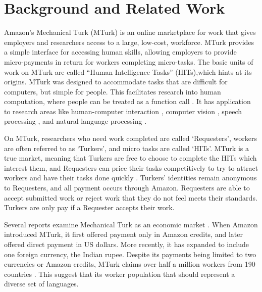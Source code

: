 \documentclass[11pt]{article}
\begin{document}

\section{Background and Related Work}
Amazon's Mechanical Turk (MTurk) is an online marketplace for work that gives employers and researchers access to a large, low-cost, workforce. MTurk provides a simple interface for accessing human skills, allowing employers to provide micro-payments in return for workers completing micro-tasks.  The basic units of work on MTurk are called ``Human Intelligence Tasks'' (HITs),which hints at its origins.  MTurk was designed to accommodate tasks that are difficult for computers, but simple for people. This facilitates research into human computation, where people can be treated as a function call \cite{vonAhn2008,Little2009,quinn-bederson:2011}.  It has application to research areas like human-computer interaction \cite{bigham-et-al:2010,bernstein-et-al:2010}, computer vision  \cite{sorkin-forsyth:2008,deng-et-al:2010,rashtchian:10}, speech processing \cite{marge:10,lane-EtAl:2010:MTURK,Parent-Eskenazi:2011,Eskenazi:2013:crowdsourcing-speech-book},  and natural language processing \cite{Snow2008,callisonburch-dredze:2010:MTURK,laws-scheible-schutze:2011:EMNLP}. 

\nocite{novotney-callisonburch:2010:NAACLHLT}

On MTurk, researchers who need work completed are called `Requesters', workers are often referred to as `Turkers', and micro tasks are called `HITs'.  MTurk is a true market, meaning that Turkers are free to choose to complete the HITs which interest them, and Requesters can price their tasks competitively to try to attract workers and have their tasks done quickly \cite{faridani-et-al:2011,singer-mittal:2011}. Turkers' identities remain anonymous to Requesters, and all payment occurs through Amazon. Requesters are able to accept submitted work or reject work that they do not feel meets their standards.  Turkers are only pay if a Requester accepts their work. 

Several reports examine Mechanical Turk as an economic market \cite{ipeirotis:2010:marketplace,lehdonvirta-ernkvist:2011}.  When Amazon introduced MTurk, it first offered payment only in Amazon credits, and later offered direct payment in US dollars. More recently, it has expanded to include one foreign currency, the Indian rupee. Despite its payments being limited to two currencies or Amazon credits, MTurk claims over half a million workers from 190 countries \cite{AmazonRequesterTour}.  This suggest that its worker population that should represent a diverse set of languages.
\end{document}
